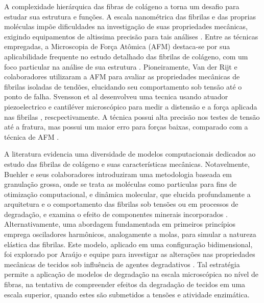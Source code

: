 \documentclass{article}
\begin{document}
    A complexidade hierárquica das fibras de colágeno a torna um desafio para estudar sua estrutura e funções. A escala nanométrica das
    fibrilas e das proprias moléculas impõe dificuldades na investigação de suas propriedades mecânicas, exigindo equipamentos de 
    altissima precisão para tais análises \cite{Nalbach2022InstrumentFT}. Entre as técnicas empregadas, a Microscopia de Força Atômica 
    (AFM) destaca-se por sua aplicabilidade frequente no estudo detalhado das fibrilas de colágeno, com um foco particular na análise de 
    sua estrutura \cite{Andriotis2015-lx,Mull2022-br}. Pioneiramente, Van der Rijt e colaboradores \cite{Rijt} utilizaram a AFM para 
    avaliar as propriedades mecânicas de fibrilas isoladas de tendões, elucidando seu comportamento sob tensão até o ponto de falha. 
    Svensson et al desenvolveu uma tecnica usando atuador piezoelectrico e cantiléver microscópico para medir a distensão e a força 
    aplicada nas fibrilas \cite{SVENSSON2018270}, rescpectivamente. A técnica possui alta precisão nos testes de tensão até a fratura,
    mas possui um maior erro para forças baixas, comparado com a técnica de AFM \cite{ANDRIOTIS202335}.

    A literatura evidencia uma diversidade de modelos computacionais dedicados ao estudo das fibrilas de colágeno e suas características 
    mecânicas. Notavelmente, Buehler e seus colaboradores \cite{B1,B2,B3} introduziram uma metodologia baseada em granulação grossa, onde se
    trata as moléculas como particulas para fins de otimização computacional, e dinâmica molecular, que elucida profundamente a arquitetura 
    e o comportamento das fibrilas sob tensões ou em processos de degradação, e examina o efeito de componentes minerais incorporados 
    \cite{B4,Malaspina2017-qp,10.1002/jbmr.2705}. Alternativamente, uma abordagem fundamentada em primeiros princípios emprega osciladores 
    harmônicos, analogamente a molas, para simular a natureza elástica das fibrilas. Este modelo, aplicado em uma configuração bidimensional,
    foi explorado por Araújo e equipe para investigar as alterações nas propriedades mecânicas de tecidos sob influência de agentes degradativos
     \cite{Araujo}. Tal estratégia permite a aplicação de modelos de degradação na  escala microscópica no nível de fibras, na tentativa de 
    compreender efeitos da degradação de tecidos em uma escala superior, quando estes são submetidos a tensões e atividade enzimática.
\end{document}
